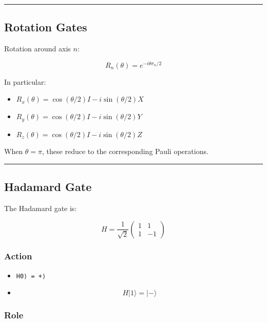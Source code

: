 \documentclass[
]{article}
\providecommand{\tightlist}{%
  \setlength{\itemsep}{0pt}\setlength{\parskip}{0pt}}
\begin{document}
\begin{center}\rule{0.5\linewidth}{0.5pt}\end{center}

\subsection{Rotation Gates}\label{rotation-gates}

Rotation around axis $n$:

\[
R_n(\theta) = e^{-i\theta\sigma_n/2}
\]

In particular:

\begin{itemize}
\tightlist
\item
  $R_x(\theta) = \cos(\theta/2)I - i\sin(\theta/2)X$
\item
  $R_y(\theta) = \cos(\theta/2)I - i\sin(\theta/2)Y$
\item
  $R_z(\theta) = \cos(\theta/2)I - i\sin(\theta/2)Z$
\end{itemize}

When $\theta = \pi$, these reduce to the corresponding Pauli
operations.

\begin{center}\rule{0.5\linewidth}{0.5pt}\end{center}

\subsection{Hadamard Gate}\label{hadamard-gate}

The Hadamard gate is:

\[
H = \frac{1}{\sqrt{2}}\begin{pmatrix}1 & 1 \\ 1 & -1\end{pmatrix}
\]

\subsubsection{Action}\label{action}

\begin{itemize}
\tightlist
\item
  \texttt{H\textbar{}0⟩\ =\ \textbar{}+⟩}
\item
$$H|1\rangle = |-\rangle$$
\end{itemize}

\subsubsection{Role}\label{role}
\end{document}
